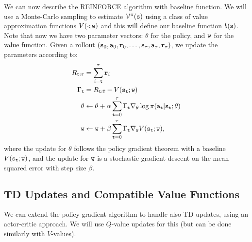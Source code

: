 We can now describe the REINFORCE algorithm with baseline function.
We will use a Monte-Carlo sampling to estimate
$\mathcal{V}^\pi({\tt s})$ using a class of value approximation functions $V(\cdot;{\tt w})$ and this will define our baseline function
$b({\tt s})$. Note that now we have two parameter vectors: $\theta$ for the policy, and ${\tt w}$ for the value function.
Given a rollout
$({\tt s}_0,{\tt a}_0,{\tt r}_0,
\ldots,{\tt s}_\tau,{\tt a}_\tau,{\tt r}_\tau)$, we update the parameters according to:
\begin{equation*}
    \begin{split}
        R_{{\tt t}:\tau}&=\sum_{i={\tt t}}^\tau {\tt r}_i\\
        \Gamma_{\tt t} &= R_{{\tt t}:{\tt T}}-V({\tt s}_{\tt t};{\tt w}) \\
        \theta &\leftarrow \theta + \alpha \sum_{{\tt t}=0}^{\tau} \Gamma_{\tt t} \nabla_{\theta} \log
\pi({\tt a}_{\tt t}|{\tt s}_{\tt t};\theta)\\
{\tt w} &\leftarrow {\tt w} + \beta \sum_{{\tt t}=0}^{\tau} \Gamma_{\tt t} \nabla_{{\tt w}} V({\tt s}_{\tt t};{\tt w}),
    \end{split}
\end{equation*}
where the update for $\theta$ follows the policy gradient theorem with a baseline $V({\tt s}_{\tt t};{\tt w})$, and the update for ${\tt w}$ is a stochastic gradient descent on the mean squared error with step size $\beta$.



\subsection{TD Updates and Compatible Value Functions}
We can extend the policy gradient algorithm to handle also TD updates, using an
actor-critic approach. We will use $Q$-value updates for this
(but can be done similarly with $V$-values).

